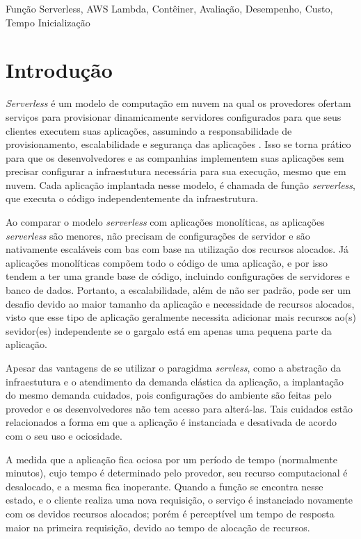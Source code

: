 \documentclass[conference]{IEEEtran}
\begin{document}
\begin{IEEEkeywords}
Função Serverless, AWS Lambda, Contêiner, Avaliação, Desempenho, Custo, Tempo Inicialização
\end{IEEEkeywords}


\section{Introdução}
\label{sec:Intro}

\textit{Serverless} é um modelo de computação em nuvem na qual os provedores ofertam serviços para provisionar  dinamicamente servidores configurados para que seus clientes executem suas aplicações, assumindo a responsabilidade de provisionamento, escalabilidade e segurança das aplicações \cite{Nupponen_2020_serverless_what_it_is}.
Isso se torna prático para que os desenvolvedores e as companhias implementem suas aplicações sem precisar configurar a infraestutura necessária para sua execução, mesmo que em nuvem. 
Cada aplicação implantada nesse modelo, é chamada de função \textit{serverless}, que executa o código independentemente da infraestrutura.

Ao comparar o modelo \textit{serverless} com aplicações monolíticas, as aplicações \textit{serverless} são menores, não precisam de configurações de servidor e são nativamente escaláveis com bas com base na utilização dos recursos alocados. Já aplicações monolíticas compõem todo o código de uma aplicação, e por isso tendem a ter uma grande base de código, incluindo configurações de servidores e banco de dados. Portanto, a escalabilidade, além de não ser padrão, pode ser um desafio devido ao maior tamanho da aplicação e necessidade de recursos alocados, visto que esse tipo de aplicação geralmente necessita adicionar mais recursos ao(s) sevidor(es) independente se o gargalo está em apenas uma pequena parte da aplicação.

Apesar das vantagens de se utilizar o paragidma \textit{servless}, como a abstração da infraestutura e o atendimento da demanda elástica da aplicação, a implantação do mesmo demanda cuidados, pois configurações do ambiente são feitas pelo provedor e os desenvolvedores não tem acesso para alterá-las. Tais cuidados estão relacionados a forma em que a aplicação é instanciada e desativada de acordo com o seu uso e ociosidade. 

A medida que a aplicação fica ociosa por um período de tempo (normalmente minutos), cujo tempo é determinado pelo provedor, seu recurso computacional é desalocado, e a mesma fica inoperante. Quando a função se encontra nesse estado, e o cliente realiza uma nova requisição, o serviço é instanciado novamente com os devidos recursos alocados; porém é perceptível um tempo de resposta maior na primeira requisição, devido ao tempo de alocação de recursos.   
\end{document}
